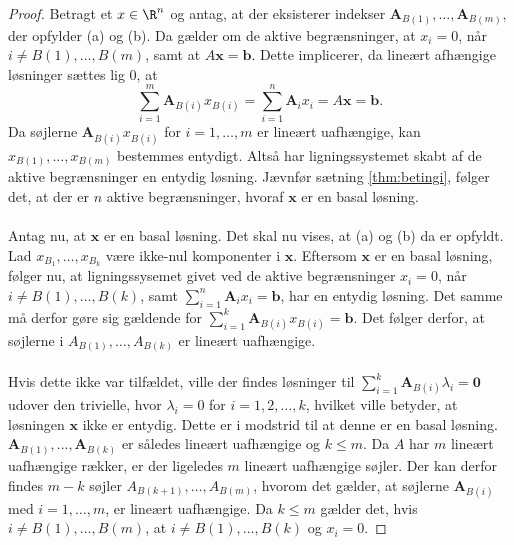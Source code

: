 \begin{proof}
Betragt et $x \in \R^n$ og antag, at der eksisterer indekser $\mathbf{A}_{B(1)},\ldots,\mathbf{A}_{B(m)}$, der opfylder (a) og (b).
Da gælder om de aktive begrænsninger, at $x_i=0$, når $i\neq B(1),\ldots,B(m)$, samt at $A\mathbf{x}=\mathbf{b}$.
Dette implicerer, da lineært afhængige løsninger sættes lig $0$,  at 
%
$$\sum_{i=1}^{m}\textbf{A}_{B(i)}x_{B(i)}=\sum_{i=1}^{n}\textbf{A}_ix_i=A\textbf{x}=\textbf{b}.$$
%
Da søjlerne $\textbf{A}_{B(i)}x_{B(i)}$ for $i=1,\ldots,m$ er lineært uafhængige, kan $x_{B(1)},\ldots,x_{B(m)}$ bestemmes entydigt. 
Altså har ligningssystemet skabt af de aktive begrænsninger en entydig løsning.
Jævnfør sætning \ref{thm:betingi},
følger det, at der er $n$ aktive begrænsninger, hvoraf $\mathbf{x}$ er en basal løsning. 
\\\\
%
%
Antag nu, at $\mathbf{x}$ er en basal løsning. 
Det skal nu vises, at (a) og (b) da er opfyldt.
Lad $x_{B_1},\ldots,x_{B_k}$ være ikke-nul komponenter i $\textbf{x}$.
Eftersom $\mathbf{x}$ er en basal løsning, følger nu, at ligningssysemet givet ved de aktive begrænsninger $x_i=0$, når $i\neq B(1),\ldots,B(k)$, samt  $\sum_{i=1}^{n}\mathbf{A}_ix_i=\mathbf{b}$, har en entydig løsning. 
Det samme må derfor gøre sig gældende for $\sum_{i=1}^{k}\mathbf{A}_{B(i)}x_{B(i)}=\mathbf{b}$.
Det følger derfor, at søjlerne i $A_{B(1)},\ldots,A_{B(k)}$ er lineært uafhængige.
\\\\
%
Hvis dette ikke var tilfældet, ville der findes løsninger til $\sum_{i=1}^{k}\mathbf{A}_{B(i)} \lambda_i=\mathbf{0}$ udover den trivielle, hvor $\lambda_i=0$ for $i=1,2,\ldots,k$, hvilket ville betyder, at løsningen $\mathbf{x}$ ikke er entydig. 
Dette er i modstrid til at denne er en basal løsning.
$\mathbf{A}_{B(1)},\ldots ,\mathbf{A}_{B(k)}$ er således lineært uafhængige og $k \leq m$.
Da $A$ har $m$ lineært uafhængige rækker, er der ligeledes $m$ lineært uafhængige søjler.
Der kan derfor findes $m-k$ søjler $A_{B(k+1)},\ldots,A_{B(m)}$, hvorom det gælder, at søjlerne $\mathbf{A}_{B(i)}$ med $i=1,\ldots,m$, er lineært uafhængige.
Da $k \leq m$ gælder det, hvis $i \neq B(1),\ldots,B(m)$, at $i \neq B(1),\ldots,B(k)$ og $x_i=0$.
%
\end{proof}
\\
